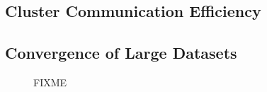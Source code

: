 \subsection{Cluster Communication Efficiency}

\subsection{Convergence of Large Datasets}
\begin{figure*}[t] %
  \centering
  \caption{FIXME}
  \label{fig-ppx}
\end{figure*}

